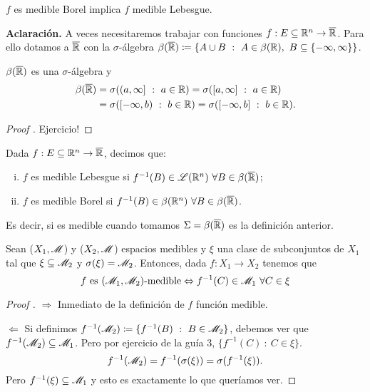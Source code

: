 \begin{remark}
	$f$ es medible Borel implica $f$ medible Lebesgue.
\end{remark}

\textbf{Aclaración.} A veces necesitaremos trabajar con funciones $f : E \subseteq \mathbb{R}^n \to \overline{\mathbb{R}}$. Para ello dotamos a $\overline{\mathbb{R}}$ con la $\sigma$-álgebra $\beta(\overline{\mathbb{R}}) \coloneq \{A \cup B \ : \ A \in \beta(\mathbb{R}),\ B \subseteq \{-\infty,\infty\} \}$. 

\begin{lemma}
	$\beta(\overline{\mathbb{R}})$ es una $\sigma$-álgebra y
	\begin{align*}
		\beta(\overline{\R}) &= \sigma((a,\infty] \ : \ a \in \R) = \sigma([a,\infty] \ : \ a \in \R) \\
		&= \sigma([-\infty,b) \ : \ b \in \R) = \sigma([-\infty,b] \ : \ b \in \R)
	.\end{align*}
\end{lemma}
\begin{proof}[Proof ]
	Ejercicio!
\end{proof}

\begin{definition}
	Dada $f : E \subseteq \mathbb{R}^n \to \overline{\mathbb{R}}$, decimos que:
	\begin{enumerate}[i.]
		\item $f$ es medible Lebesgue si $f^{-1}(B) \in \mathscr{L}(\mathbb{R}^n) \ \forall B \in \beta(\overline{\mathbb{R}})$;

		\item $f$ es medible Borel si $f^{-1}(B) \in \beta(\mathbb{R}^n) \ \forall B \in \beta(\overline{\mathbb{R}})$.
	\end{enumerate}
	Es decir, si es medible cuando tomamos $\Sigma = \beta(\overline{\mathbb{R}})$ es la definición anterior.
\end{definition}

\begin{prop}
	Sean ($X_{1}, \mathscr{M}$) y ($X_{2}, \mathscr{M}$) espacios medibles y $\xi$ una clase de subconjuntos de $X_{1}$ tal que $\xi \subseteq \mathscr{M}_{2}$ y $\sigma(\xi) = \mathscr{M}_{2}$. Entonces, dada $f : X_{1} \to X_{2}$ tenemos que
	\[ f \text{ es } (\mathscr{M}_{1}, \mathscr{M}_{2}) \text{-medible} \Leftrightarrow f^{-1}(C) \in \mathscr{M}_{1} \ \forall C \in \xi \]
\end{prop}
\begin{proof}[Proof ]
	$\boxed{\Rightarrow}$ Inmediato de la definición de $f$ función medible. \par
	\medskip
	$\boxed{\Leftarrow}$ Si definimos $f^{-1}(\mathscr{M}_{2}) \coloneq \{f^{-1}(B) \ : \ B \in \mathscr{M}_{2}\}$, debemos ver que $f^{-1}(\mathscr{M}_{2}) \subseteq \mathscr{M}_{1}$. Pero por ejercicio de la guía 3, $\{f^{-1}(C) \ : \ C \in \xi\}$.
	\[ f^{-1}(\mathscr{M}_{2}) = f^{-1}(\sigma(\xi)) = \sigma(f^{-1}(\xi)). \]
	Pero $f^{-1}(\xi) \subseteq \mathscr{M}_{1}$ y esto es exactamente lo que queríamos ver.
\end{proof}

